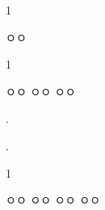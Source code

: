 
\begin{solbox}{1}
\bnset
{}
\bn \zzz


 ㅇㅇ
\end{solbox}


\begin{solbox}{1}
\bnset
{}
\bn \zzz

\bnset
{}
\bn \zzz

\bnset
{}
\bn \zzz

 ㅇㅇ \zzz
{} ㅇㅇ \zzz
{} ㅇㅇ
\end{solbox}







                    {
\begin{problembox}{\thechapter. \ProblemNumberumber}


\end{problembox}

\begin{problembox}{\thechapter. \ProblemNumberumber}


\end{problembox}

\begin{solbox}{1}
\bnset
{}


\bn \zzz

\bnset
{}
\bn \zzz

\bnset
{}
\bn \zzz

 ㅇㅇ \zzz
{} ㅇㅇ \zzz
{} ㅇㅇ \zzz
{} ㅇㅇ
\end{solbox}
\clearpage}





